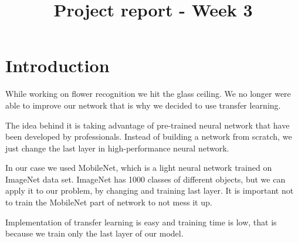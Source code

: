 

\title{Project report - Week 3}


	\maketitle
	\section{Introduction}
	
	    While working on flower recognition we hit the glass ceiling. We no longer were able to improve our network that is why we decided to use transfer learning.
	    
	    The idea behind it is taking advantage of pre-trained neural network that have been developed by professionals.
        Instead of building a network from scratch, we just change the last layer in high-performance neural network.
        
        In our case we used MobileNet, which is a light neural network trained on ImageNet data set. ImageNet has 1000 classes of different objects, but we can apply it to our problem, by changing and training last layer. It is important not to train the MobileNet part of network to not mess it up.
	    
	    Implementation of transfer learning is easy and training time is low, that is because we train only the last layer of our model.
	    
